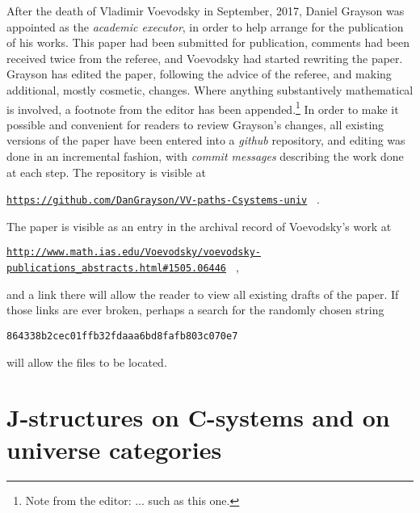 \documentclass[12pt]{article}
\numberwithin{equation}{section}
\begin{document}
\newcommand{\editorfootnote}[1]{\footnote{Note from the editor: #1}}

After the death of Vladimir Voevodsky in September, 2017, Daniel Grayson was
appointed as the {\em academic executor}, in order to help arrange for the
publication of his works.  This paper had been submitted for publication,
comments had been received twice from the referee, and Voevodsky had started
rewriting the paper.
Grayson has edited the paper, following the advice of the referee, and making
additional, mostly cosmetic, changes.  Where anything substantively mathematical is
involved, a footnote from the editor has been appended.\editorfootnote{... such
  as this one.}
In order to make it possible and convenient for readers to review Grayson's
changes, all existing versions of the paper have been entered into a {\em github}
repository, and editing was done in an incremental fashion, with {\em commit
  messages} describing the work done at each step.  The repository is visible
at
\hfill\break\centerline{\tiny{\tt \href{https://github.com/DanGrayson/VV-paths-Csystems-univ}{https://github.com/DanGrayson/VV-paths-Csystems-univ}%
  } .}
The paper is visible as an entry in the archival record of Voevodsky's work at
\hfill\break\centerline{\tiny{\tt \href{http://www.math.ias.edu/Voevodsky/voevodsky-publications\_abstracts.html\#1505.06446}{http://www.math.ias.edu/Voevodsky/voevodsky-publications\_abstracts.html\#1505.06446}%
  } ,}
and a link there will allow the reader to view all existing drafts of the paper.
If those links are ever broken, perhaps a search for the randomly chosen string
\hfill\break\centerline{{\tt 864338b2cec01ffb32fdaaa6bd8fafb803c070e7}}
will allow the files to be located.

\section{J-structures on C-systems and on universe categories}
\end{document}
